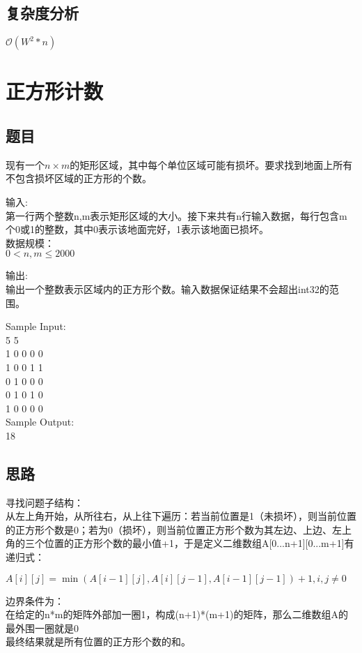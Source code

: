 \documentclass[UTF8]{ctexart}
\begin{document}
\subsection{复杂度分析}
$\mathcal{O}(W^2*n)$

\section{正方形计数}

\subsection{题目}
现有一个$n\times m$的矩形区域，其中每个单位区域可能有损坏。要求找到地面上所有不包含损坏区域的正方形的个数。

输入:\\
第一行两个整数n,m表示矩形区域的大小。接下来共有n行输入数据，每行包含m个0或1的整数，其中0表示该地面完好，1表示该地面已损坏。\\

数据规模：\\
$0<n,m\leq 2000$

输出:\\
输出一个整数表示区域内的正方形个数。输入数据保证结果不会超出int32的范围。

Sample Input:\\
5 5\\
1 0 0 0 0 \\
1 0 0 1 1 \\
0 1 0 0 0 \\
0 1 0 1 0 \\
1 0 0 0 0 \\

Sample Output:\\
18

\subsection{思路}
寻找问题子结构：\\
从左上角开始，从所往右，从上往下遍历：若当前位置是1（未损坏），则当前位置的正方形个数是0；若为0（损坏），则当前位置正方形个数为其左边、上边、左上角的三个位置的正方形个数的最小值+1，于是定义二维数组A[0...n+1][0...m+1]有递归式：\\
\begin{center}
$A[i][j]=\min(A[i-1][j],A[i][j-1],A[i-1][j-1])+1,i,j\neq 0$
\end{center}
边界条件为：\\
在给定的n*m的矩阵外部加一圈1，构成(n+1)*(m+1)的矩阵，那么二维数组A的最外围一圈就是0\\
最终结果就是所有位置的正方形个数的和。
\end{document}
